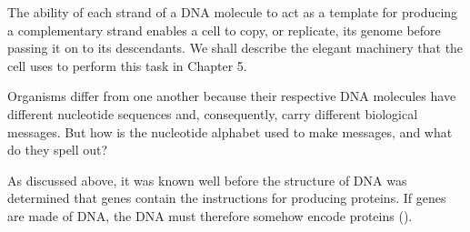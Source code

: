 \begin{fullpage}

    
\end{fullpage}

The ability of each strand of a DNA molecule to act as a template for producing
a complementary strand enables a cell to copy, or replicate, its genome before
passing it on to its descendants. We shall describe the elegant machinery that the
cell uses to perform this task in Chapter 5.

Organisms diﬀer from one another because their respective DNA molecules
have different nucleotide sequences and, consequently, carry different biological
messages. But how is the nucleotide alphabet used to make messages, and what do they spell out?

As discussed above, it was known well before the structure of DNA was determined that genes contain the instructions for producing proteins. If genes are made of DNA, the DNA must therefore somehow encode proteins ().

